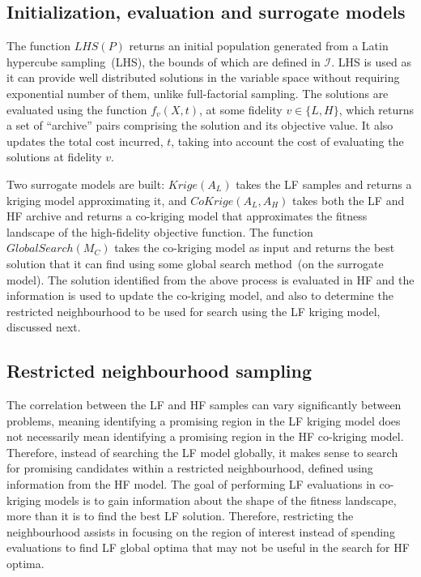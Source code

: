 \subsection{Initialization, evaluation and surrogate models}
The function $LHS(P)$ returns an initial population generated from a Latin hypercube sampling~(LHS), the bounds of which are defined in $\mathcal{I}$. LHS is used as it can provide well distributed solutions in the variable space without requiring exponential number of them, unlike full-factorial sampling. The solutions are evaluated using the function $f_v(X,t)$, at some fidelity $v\in \{L,H\}$, which returns a set of ``archive'' pairs comprising the solution and its objective value. It also updates the total cost incurred, $t$, taking into account the cost of evaluating the solutions at fidelity $v$. 

Two surrogate models are built: $Krige(A_L)$ takes the LF samples and returns a kriging model approximating it, and $CoKrige(A_L,A_H)$ takes both the LF and HF archive and returns a co-kriging model that approximates the fitness landscape of the high-fidelity objective function. The function $GlobalSearch(M_C)$ takes the co-kriging model as input and returns the best solution that it can find using some global search method~(on the surrogate model). The solution identified from the above process is evaluated in HF and the information is used to update the co-kriging model, and also to determine the restricted neighbourhood to be used for search using the LF kriging model, discussed next.

\subsection{Restricted neighbourhood sampling}\label{subsec:restrict}
The correlation between the LF and HF samples can vary significantly between problems, meaning identifying a promising region in the LF kriging model does not necessarily mean identifying a promising region in the HF co-kriging model. Therefore, instead of searching the LF model globally, it makes sense to search for promising candidates within a restricted neighbourhood, defined using information from the HF model. The goal of performing LF evaluations in co-kriging models is to gain information about the shape of the fitness landscape, more than it is to find the best LF solution. Therefore, restricting the neighbourhood assists in focusing on the region of interest instead of spending evaluations to find LF global optima that may not be useful in the search for HF optima.

